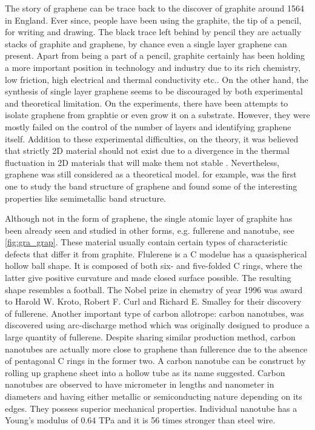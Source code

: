 The story of graphene can be trace back to the discover of graphite around 1564 in England\cite{petroski1990pencil}. Ever since, people have been using the graphite, the tip of a pencil, for writing and drawing. The black trace left behind by pencil they are actually stacks of graphite and graphene, by chance even a single layer graphene can present.  Apart from being a part of a pencil, graphite certainly has been holding a more important position in technology and industry due to its rich chemistry, low friction, high electrical and thermal conductivity etc.. On the other hand, the synthesis of single layer graphene seems to be discouraged by both experimental and theoretical limitation. On the experiments, there have been attempts\cite{Krishnan1997,Ohashi1997,Dresselhaus2002,Shioyama2001} to isolate graphene from graphtie or even grow it on a substrate. However, they were mostly failed on the control of the number of layers and identifying graphene itself.  Addition to these experimental difficulties, on the theory, it was believed that strictly 2D material should not exist due to a divergence in the thermal fluctuation in 2D materials that will make them not stable \cite{Peierls1935,Landau1937,Mermin1968}. Nevertheless, graphene was still considered as a theoretical model. for example, \citet{Wallace1947} was the first one to study the band structure of graphene \cite{CastroNeto2009} and found some of the interesting properties like semimetallic band structure. 

Although not in the form of graphene, the single atomic layer of graphite has been already seen and studied in other forms, e.g. fullerene and nanotube, see \autoref{fig:gra_grap}. These material usually contain certain types of characteristic defects that differ it from graphite.  Flulerene is a C modelue has a quasispherical hollow ball shape. It is composed of both six- and five-folded C rings, where the latter give positive curvature and made closed surface possible. The resulting shape resembles a football\cite{Kroto1985,Lamb1990}. The Nobel prize in chemstry of year 1996 was award to Harold W. Kroto, Robert F. Curl and Richard E. Smalley for their discovery of fullerene. Another important type of carbon allotrope: carbon nanotubes\cite{Iijima1993}, was discovered using arc-discharge method\cite{Lamb1990} which was originally designed to produce a large quantity of fullerene. Despite sharing similar production method, carbon nanotubes are actually more close to graphene than fullerence due to the absence of pentagonal C rings in the former two. A carbon nanotube can be construct by rolling up graphene sheet into a hollow tube as its name suggested. Carbon nanotubes are observed to have micrometer in lengths and nanometer in diameters and having either metallic or semiconducting nature depending on its edges. They possess superior mechanical properties. Individual nanotube has a Young's modulus of 0.64 TPa and it is 56 times stronger than steel wire\cite{Baughman787}.

